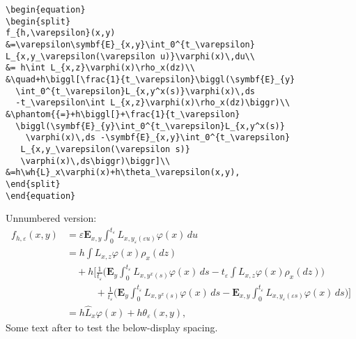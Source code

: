 \documentclass{article}
\theoremstyle{definition}
\theoremstyle{remark}
\newcommand{\wh}{\widehat}
\begin{document}
\begin{verbatim}
\begin{equation}
\begin{split}
f_{h,\varepsilon}(x,y)
&=\varepsilon\symbf{E}_{x,y}\int_0^{t_\varepsilon}
L_{x,y_\varepsilon(\varepsilon u)}\varphi(x)\,du\\
&= h\int L_{x,z}\varphi(x)\rho_x(dz)\\
&\quad+h\biggl[\frac{1}{t_\varepsilon}\biggl(\symbf{E}_{y}
  \int_0^{t_\varepsilon}L_{x,y^x(s)}\varphi(x)\,ds
  -t_\varepsilon\int L_{x,z}\varphi(x)\rho_x(dz)\biggr)\\
&\phantom{{=}+h\biggl[}+\frac{1}{t_\varepsilon}
  \biggl(\symbf{E}_{y}\int_0^{t_\varepsilon}L_{x,y^x(s)}
    \varphi(x)\,ds -\symbf{E}_{x,y}\int_0^{t_\varepsilon}
   L_{x,y_\varepsilon(\varepsilon s)}
   \varphi(x)\,ds\biggr)\biggr]\\
&=h\wh{L}_x\varphi(x)+h\theta_\varepsilon(x,y),
\end{split}
\end{equation}
\end{verbatim}

\newpage
Unnumbered version:
\begin{equation*}
\begin{split}
f_{h,\varepsilon}(x,y)
&=\varepsilon\symbf{E}_{x,y}\int_0^{t_\varepsilon}
L_{x,y_\varepsilon(\varepsilon u)}\varphi(x)\,du\\
&= h\int L_{x,z}\varphi(x)\rho_x(dz)\\
&\quad+h\biggl[\frac{1}{t_\varepsilon}\biggl(\symbf{E}_{y}
  \int_0^{t_\varepsilon}L_{x,y^x(s)}\varphi(x)\,ds
  -t_\varepsilon\int L_{x,z}\varphi(x)\rho_x(dz)\biggr)\\
&\phantom{{=}+h\biggl[}+\frac{1}{t_\varepsilon}
  \biggl(\symbf{E}_{y}\int_0^{t_\varepsilon}L_{x,y^x(s)}
    \varphi(x)\,ds -\symbf{E}_{x,y}\int_0^{t_\varepsilon}
   L_{x,y_\varepsilon(\varepsilon s)}
   \varphi(x)\,ds\biggr)\biggr]\\
&=h\wh{L}_x\varphi(x)+h\theta_\varepsilon(x,y),
\end{split}
\end{equation*}
Some text after to test the below-display spacing.
\end{document}
